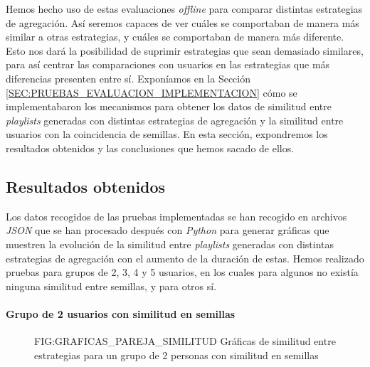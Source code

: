 Hemos hecho uso de estas evaluaciones \textit{offline} para comparar distintas estrategias de agregación. Así seremos
capaces de ver cuáles se comportaban de manera más similar a otras estrategias, y cuáles se comportaban de manera más diferente. Esto nos dará la posibilidad de suprimir
estrategias que sean demasiado similares, para así centrar las comparaciones con usuarios en las estrategias que más diferencias presenten entre sí.
Exponíamos en la Sección \ref{SEC:PRUEBAS_EVALUACION_IMPLEMENTACION} cómo se implementabaron los mecanismos para obtener los datos de similitud entre \textit{playlists} generadas 
con distintas estrategias de agregación y la similitud entre usuarios con la coincidencia de semillas. En esta sección, expondremos los resultados obtenidos y las conclusiones 
que hemos sacado de ellos.

\subsection{Resultados obtenidos\label{SEC:RESULTADOS_OBTENIDOS}}

Los datos recogidos de las pruebas implementadas se han recogido en archivos \textit{JSON} que se han procesado después con \textit{Python} para generar gráficas que muestren la evolución 
de la similitud entre \textit{playlists} generadas con distintas estrategias de agregación con el aumento de la duración de estas. Hemos realizado pruebas para grupos de 
2, 3, 4 y 5 usuarios, en los cuales para algunos no existía ninguna similitud entre semillas, y para otros sí. 

\paragraph{Grupo de 2 usuarios con similitud en semillas}

\begin{figure}[Gráficas de similitud entre estrategias para un grupo de 2 personas con similitud en semillas]{FIG:GRAFICAS_PAREJA_SIMILITUD}
    {Gráficas de similitud entre estrategias para un grupo de 2 personas con similitud en semillas}
\end{figure}

